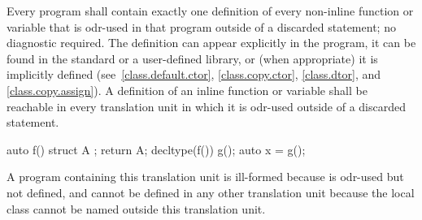 \pnum
Every program shall contain exactly one definition of every non-inline
function or variable that is odr-used in that program
outside of a discarded statement; no diagnostic required.
The definition can appear explicitly in the program, it can be found in
the standard or a user-defined library, or (when appropriate) it is
implicitly defined (see~\ref{class.default.ctor}, \ref{class.copy.ctor},
\ref{class.dtor}, and \ref{class.copy.assign}).
A definition of an inline function or variable shall be reachable in every
translation unit in which it is odr-used outside of a discarded statement.
\begin{example}
\begin{codeblock}
auto f() {
  struct A {};
  return A{};
}
decltype(f()) g();
auto x = g();
\end{codeblock}
A program containing this translation unit is ill-formed
because  is odr-used but not defined,
and cannot be defined in any other translation unit
because the local class  cannot be named outside this
translation unit.
\end{example}

